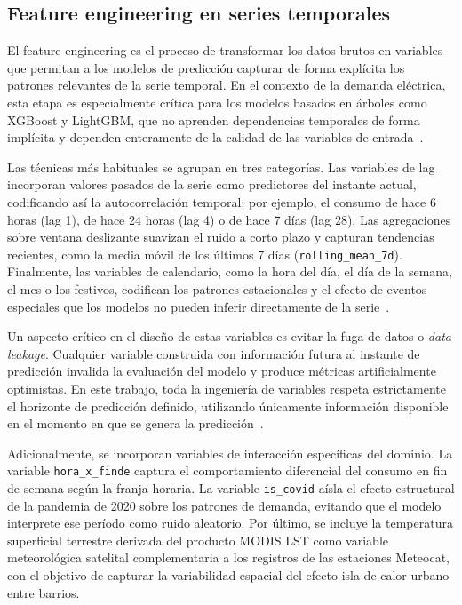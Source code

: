 \documentclass[12pt, a4paper]{article}
\begin{document}
\subsection{Feature engineering en series temporales}

El feature engineering es el proceso de transformar los datos brutos en variables que permitan a los modelos de predicción capturar de forma explícita los patrones relevantes de la serie temporal. En el contexto de la demanda eléctrica, esta etapa es especialmente crítica para los modelos basados en árboles como XGBoost y LightGBM, que no aprenden dependencias temporales de forma implícita y dependen enteramente de la calidad de las variables de entrada~\cite{rubattu2023}.

Las técnicas más habituales se agrupan en tres categorías. Las variables de lag incorporan valores pasados de la serie como predictores del instante actual, codificando así la autocorrelación temporal: por ejemplo, el consumo de hace 6 horas (lag 1), de hace 24 horas (lag 4) o de hace 7 días (lag 28). Las agregaciones sobre ventana deslizante suavizan el ruido a corto plazo y capturan tendencias recientes, como la media móvil de los últimos 7 días (\texttt{rolling\_mean\_7d}). Finalmente, las variables de calendario, como la hora del día, el día de la semana, el mes o los festivos, codifican los patrones estacionales y el efecto de eventos especiales que los modelos no pueden inferir directamente de la serie~\cite{rubattu2023}.

Un aspecto crítico en el diseño de estas variables es evitar la fuga de datos o \textit{data leakage}. Cualquier variable construida con información futura al instante de predicción invalida la evaluación del modelo y produce métricas artificialmente optimistas. En este trabajo, toda la ingeniería de variables respeta estrictamente el horizonte de predicción definido, utilizando únicamente información disponible en el momento en que se genera la predicción~\cite{rubattu2023}.

Adicionalmente, se incorporan variables de interacción específicas del dominio. La variable \texttt{hora\_x\_finde} captura el comportamiento diferencial del consumo en fin de semana según la franja horaria. La variable \texttt{is\_covid} aísla el efecto estructural de la pandemia de 2020 sobre los patrones de demanda, evitando que el modelo interprete ese período como ruido aleatorio. Por último, se incluye la temperatura superficial terrestre derivada del producto MODIS LST como variable meteorológica satelital complementaria a los registros de las estaciones Meteocat, con el objetivo de capturar la variabilidad espacial del efecto isla de calor urbano entre barrios.
\end{document}
